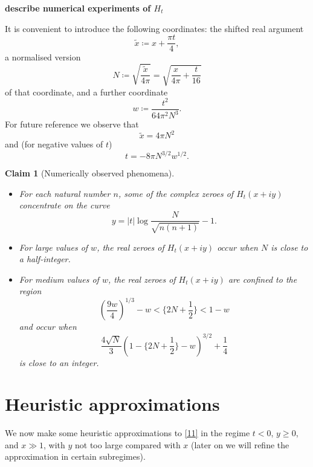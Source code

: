 \documentclass[a4paper,11pt,twoside]{amsart}
\newtheorem{claim}[theorem]{Claim}
\begin{document}
{\bf describe numerical experiments of $H_t$}

It is convenient to introduce the following coordinates: the shifted real argument
\begin{equation}\label{tx-def}
\tilde x \coloneqq x + \frac{\pi t}{4},
\end{equation}
a normalised version
\begin{equation}\label{n-def}
N \coloneqq \sqrt{\frac{\tilde x}{4\pi}} = \sqrt{\frac{x}{4\pi} + \frac{t}{16}}
\end{equation}
of that coordinate, and a further coordinate
$$ w \coloneqq \frac{t^2}{64\pi^2 N^3}.$$
For future reference we observe that
\begin{equation}\label{tx-form}
\tilde x = 4\pi N^2
\end{equation}
and (for negative values of $t$)
\begin{equation}\label{t-form}
t = - 8 \pi N^{3/2} w^{1/2}.
\end{equation}


\begin{claim}[Numerically observed phenomena]\label{nup}  
\begin{itemize}
\item[(i)]  For each natural number $n$, some of the complex zeroes of $H_t(x+iy)$ concentrate on the curve
\begin{equation}\label{yan}
 y = |t| \log \frac{N}{\sqrt{n(n+1)}} - 1.
\end{equation}
\item[(ii)]  For large values of $w$, the real zeroes of $H_t(x+iy)$ occur when $N$ is close to a half-integer.
\item[(iii)]  For medium values of $w$, the real zeroes of $H_t(x+iy)$ are confined to the region
$$ (\frac{9w}{4})^{1/3} - w < \{ 2N + \frac{1}{2}\} < 1-w $$
and occur when
$$ \frac{4 \sqrt{N}}{3} (1 - \{ 2N + \frac{1}{2}\} - w)^{3/2} + \frac{1}{4} $$
is close to an integer.
\end{itemize}
\end{claim}



\section{Heuristic approximations}

We now make some heuristic approximations to \eqref{11} in the regime $t<0$, $y \geq 0$, and $x \gg 1$, with $y$ not too large compared with $x$ (later on we will refine the approximation in certain subregimes).
\end{document}
